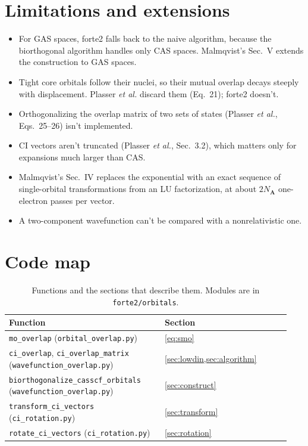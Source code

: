 \documentclass[aip,jcp,preprint]{revtex4-1}
\newcommand{\bvec}[1]{\mathbf{#1}}
\newcommand{\Nact}{N_{\bvec{A}}}
\begin{document}
\section{Limitations and extensions}
\label{sec:limitations}

\begin{itemize}
\item For GAS spaces, forte2 falls back to the naive algorithm, because the biorthogonal algorithm handles only CAS spaces.
Malmqvist's Sec.~V extends the construction to GAS spaces.
\item Tight core orbitals follow their nuclei, so their mutual overlap decays steeply with displacement.
Plasser \emph{et al.} discard them (Eq.~21); forte2 doesn't.
\item Orthogonalizing the overlap matrix of two sets of states (Plasser \emph{et al.}, Eqs.~25--26) isn't implemented.
\item CI vectors aren't truncated (Plasser \emph{et al.}, Sec.~3.2), which matters only for expansions much larger than CAS.
\item Malmqvist's Sec.~IV replaces the exponential with an exact sequence of single-orbital transformations from an LU factorization, at about $2\Nact$ one-electron passes per vector.
\item A two-component wavefunction can't be compared with a nonrelativistic one.
\end{itemize}

\appendix

\section{Code map}
\label{app:code}

\begin{table}[h]
\caption{Functions and the sections that describe them.
Modules are in \texttt{forte2/orbitals}.}
\label{tab:code}
\begin{tabular}{@{}p{0.52\linewidth}p{0.42\linewidth}@{}}
\hline
Function & Section \\
\hline
\texttt{mo\_overlap} (\texttt{orbital\_overlap.py}) & \cref{eq:smo} \\
\texttt{ci\_overlap}, \texttt{ci\_overlap\_matrix} (\texttt{wavefunction\_overlap.py}) &
 \cref{sec:lowdin,sec:algorithm} \\
\texttt{biorthogonalize\_casscf\_orbitals} (\texttt{wavefunction\_overlap.py})
 & \cref{sec:construct} \\
\texttt{transform\_ci\_vectors} (\texttt{ci\_rotation.py}) &
 \cref{sec:transform} \\
\texttt{rotate\_ci\_vectors} (\texttt{ci\_rotation.py}) & \cref{sec:rotation} \\
\hline
\end{tabular}
\end{table}
\end{document}
